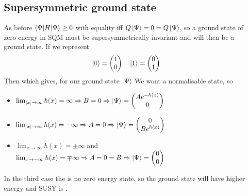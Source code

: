 \documentclass{article}
\begin{document}
\subsection{Supersymmetric ground state}
As before $\braket{\Psi|H|\Psi}\geq 0$ with equality iff $Q\ket{\Psi}=0=\bar{Q}\ket{\Psi}$, so a ground state of zero energy in SQM must be supersymmetrically invariant and will then be a ground state. If we represent 
\[
\ket{0} = \begin{pmatrix} 1 \\ 0 \end{pmatrix} \quad \ket{1} = \begin{pmatrix} 0 \\ 1 \end{pmatrix}
\]
Then 
which gives, for our ground state $\ket{\Psi}$
We want a normalisable state, so 
\begin{itemize}
    \item $\lim_{|x|\to\infty} h(x) = \infty \Rightarrow B=0 \Rightarrow \ket{\Psi} = \begin{pmatrix} A e^{-h(x)} \\ 0 \end{pmatrix}$ 
    \item $\lim_{|x|\to\infty} h(x) = -\infty \Rightarrow A=0 \Rightarrow \ket{\Psi} = \begin{pmatrix} 0 \\ B e^{h(x)} \end{pmatrix}$ 
    \item $\lim_{x\to\infty} h(x) = \pm\infty$ and $\lim_{x\to -\infty} h(x) = \mp\infty\Rightarrow A=0=B \Rightarrow \ket{\Psi} = \begin{pmatrix} 0 \\ 0 \end{pmatrix}$ 
\end{itemize}
In the third case the is no zero energy state, so the ground state will have higher energy and SUSY is . 
\end{document}
